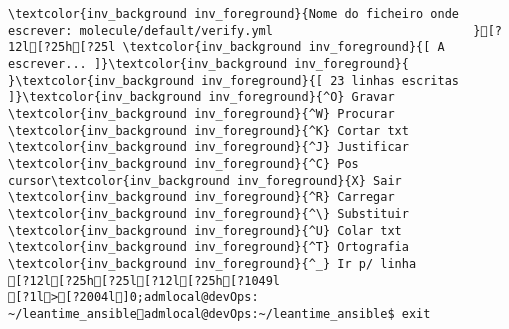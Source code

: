 \documentclass{scrartcl}
\begin{document}
\begin{Verbatim}
\textcolor{inv_background inv_foreground}{Nome do ficheiro onde escrever: molecule/default/verify.yml                            }[?12l[?25h[?25l \textcolor{inv_background inv_foreground}{[ A escrever... ]}\textcolor{inv_background inv_foreground}{          }\textcolor{inv_background inv_foreground}{[ 23 linhas escritas ]}\textcolor{inv_background inv_foreground}{^O} Gravar     \textcolor{inv_background inv_foreground}{^W} Procurar   \textcolor{inv_background inv_foreground}{^K} Cortar txt \textcolor{inv_background inv_foreground}{^J} Justificar \textcolor{inv_background inv_foreground}{^C} Pos cursor\textcolor{inv_background inv_foreground}{X} Sair       \textcolor{inv_background inv_foreground}{^R} Carregar   \textcolor{inv_background inv_foreground}{^\} Substituir \textcolor{inv_background inv_foreground}{^U} Colar txt  \textcolor{inv_background inv_foreground}{^T} Ortografia \textcolor{inv_background inv_foreground}{^_} Ir p/ linha
[?12l[?25h[?25l[?12l[?25h[?1049l
[?1l>[?2004l]0;admlocal@devOps: ~/leantime_ansibleadmlocal@devOps:~/leantime_ansible$ exit

\end{Verbatim}
\end{document}
